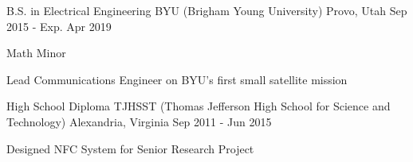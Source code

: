 

\begin{cventries}

  \cventry
  {B.S. in Electrical Engineering} %
  {BYU (Brigham Young University)} %
  {Provo, Utah} %
  {Sep 2015 - Exp. Apr 2019} %
    {
      \begin{cvitems} %
      \item {Math Minor}
      \item {Lead Communications Engineer on BYU's first small satellite mission}
      \end{cvitems}
    }

  \cventry
  {High School Diploma} %
  {TJHSST (Thomas Jefferson High School for Science and Technology)} %
  {Alexandria, Virginia} %
  {Sep 2011 - Jun 2015} %
    {
      \begin{cvitems} %
      \item {Designed NFC System for Senior Research Project}
      \end{cvitems}
    }

\end{cventries}
